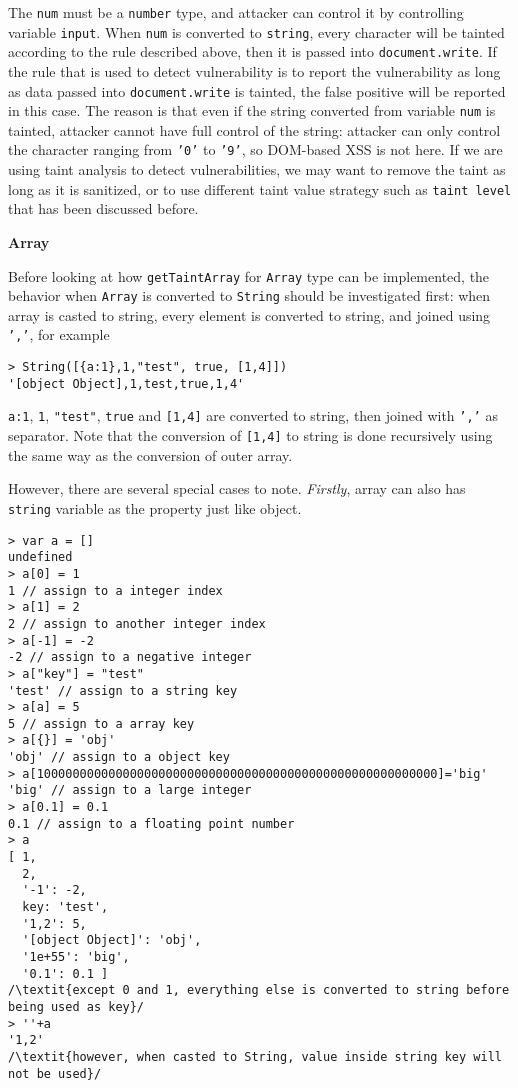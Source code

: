 The \texttt{num} must be a \texttt{number} type, and attacker can control it by controlling variable \texttt{input}. When \texttt{num} is converted to \texttt{string}, every character will be tainted according to the rule described above, then it is passed into \texttt{document.write}. If the rule that is used to detect vulnerability is to report the vulnerability as long as data passed into \texttt{document.write} is tainted, the false positive will be reported in this case. The reason is that even if the string converted from variable \texttt{num} is tainted, attacker cannot have full control of the string: attacker can only control the character ranging from \texttt{'0'} to \texttt{'9'}, so DOM-based XSS is not here. If we are using taint analysis to detect vulnerabilities, we may want to remove the taint as long as it is sanitized, or to use different taint value strategy such as \texttt{taint level} that has been discussed before.

\textbf{Array}

Before looking at how \texttt{getTaintArray} for \texttt{Array} type can be implemented, the behavior when \texttt{Array} is converted to \texttt{String} should be investigated first: when array is casted to string, every element is converted to string, and joined using \texttt{','}, for example

\begin{verbatim}
> String([{a:1},1,"test", true, [1,4]])
'[object Object],1,test,true,1,4'
\end{verbatim}

\texttt{{a:1}}, \texttt{1}, \texttt{"test"}, \texttt{true} and \texttt{[1,4]} are converted to string, then joined with \texttt{','} as separator. Note that the conversion of \texttt{[1,4]} to string is done recursively using the same way as the conversion of outer array.

However, there are several special cases to note. \textit{Firstly}, array can also has \texttt{string} variable as the property just like object.

\begin{verbatim}
> var a = []
undefined
> a[0] = 1
1 // assign to a integer index
> a[1] = 2
2 // assign to another integer index
> a[-1] = -2
-2 // assign to a negative integer
> a["key"] = "test"
'test' // assign to a string key 
> a[a] = 5
5 // assign to a array key
> a[{}] = 'obj'
'obj' // assign to a object key
> a[10000000000000000000000000000000000000000000000000000000]='big'
'big' // assign to a large integer
> a[0.1] = 0.1
0.1 // assign to a floating point number
> a
[ 1,
  2,
  '-1': -2,
  key: 'test',
  '1,2': 5,
  '[object Object]': 'obj',
  '1e+55': 'big',
  '0.1': 0.1 ]
/\textit{except 0 and 1, everything else is converted to string before being used as key}/
> ''+a
'1,2'
/\textit{however, when casted to String, value inside string key will not be used}/
\end{verbatim}

